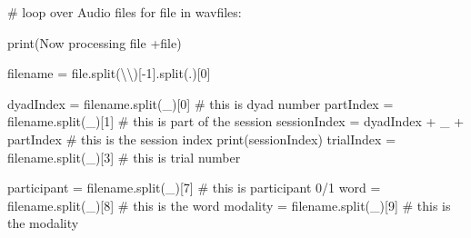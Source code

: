 \documentclass[
  letterpaper,
  DIV=11,
  numbers=noendperiod]{scrreprt}
\newenvironment{Shaded}{\begin{snugshade}}{\end{snugshade}}
\newcommand{\BuiltInTok}[1]{\textcolor[rgb]{0.00,0.23,0.31}{#1}}
\newcommand{\CharTok}[1]{\textcolor[rgb]{0.13,0.47,0.30}{#1}}
\newcommand{\CommentTok}[1]{\textcolor[rgb]{0.37,0.37,0.37}{#1}}
\newcommand{\ControlFlowTok}[1]{\textcolor[rgb]{0.00,0.23,0.31}{#1}}
\newcommand{\DecValTok}[1]{\textcolor[rgb]{0.68,0.00,0.00}{#1}}
\newcommand{\KeywordTok}[1]{\textcolor[rgb]{0.00,0.23,0.31}{#1}}
\newcommand{\NormalTok}[1]{\textcolor[rgb]{0.00,0.23,0.31}{#1}}
\newcommand{\OperatorTok}[1]{\textcolor[rgb]{0.37,0.37,0.37}{#1}}
\newcommand{\StringTok}[1]{\textcolor[rgb]{0.13,0.47,0.30}{#1}}
\begin{document}
\begin{Shaded}
\begin{Highlighting}[]
\CommentTok{\# loop over Audio files}
\ControlFlowTok{for} \BuiltInTok{file} \KeywordTok{in}\NormalTok{ wavfiles:}

    \BuiltInTok{print}\NormalTok{(}\StringTok{\textquotesingle{}Now processing file \textquotesingle{}}\OperatorTok{+}\BuiltInTok{file}\NormalTok{)}

\NormalTok{    filename }\OperatorTok{=} \BuiltInTok{file}\NormalTok{.split(}\StringTok{\textquotesingle{}}\CharTok{\textbackslash{}\textbackslash{}}\StringTok{\textquotesingle{}}\NormalTok{)[}\OperatorTok{{-}}\DecValTok{1}\NormalTok{].split(}\StringTok{\textquotesingle{}.\textquotesingle{}}\NormalTok{)[}\DecValTok{0}\NormalTok{]}

\NormalTok{    dyadIndex }\OperatorTok{=}\NormalTok{ filename.split(}\StringTok{\textquotesingle{}\_\textquotesingle{}}\NormalTok{)[}\DecValTok{0}\NormalTok{]   }\CommentTok{\# this is dyad number}
\NormalTok{    partIndex }\OperatorTok{=}\NormalTok{ filename.split(}\StringTok{\textquotesingle{}\_\textquotesingle{}}\NormalTok{)[}\DecValTok{1}\NormalTok{]   }\CommentTok{\# this is part of the session}
\NormalTok{    sessionIndex }\OperatorTok{=}\NormalTok{ dyadIndex }\OperatorTok{+} \StringTok{\textquotesingle{}\_\textquotesingle{}} \OperatorTok{+}\NormalTok{ partIndex }\CommentTok{\# this is the session index}
    \BuiltInTok{print}\NormalTok{(sessionIndex)}
\NormalTok{    trialIndex }\OperatorTok{=}\NormalTok{ filename.split(}\StringTok{\textquotesingle{}\_\textquotesingle{}}\NormalTok{)[}\DecValTok{3}\NormalTok{] }\CommentTok{\# this is trial number}

\NormalTok{    participant }\OperatorTok{=}\NormalTok{ filename.split(}\StringTok{\textquotesingle{}\_\textquotesingle{}}\NormalTok{)[}\DecValTok{7}\NormalTok{] }\CommentTok{\# this is participant 0/1}
\NormalTok{    word }\OperatorTok{=}\NormalTok{ filename.split(}\StringTok{\textquotesingle{}\_\textquotesingle{}}\NormalTok{)[}\DecValTok{8}\NormalTok{] }\CommentTok{\# this is the word}
\NormalTok{    modality }\OperatorTok{=}\NormalTok{ filename.split(}\StringTok{\textquotesingle{}\_\textquotesingle{}}\NormalTok{)[}\DecValTok{9}\NormalTok{] }\CommentTok{\# this is the modality}


\end{Highlighting}
\end{Shaded}
\end{document}
